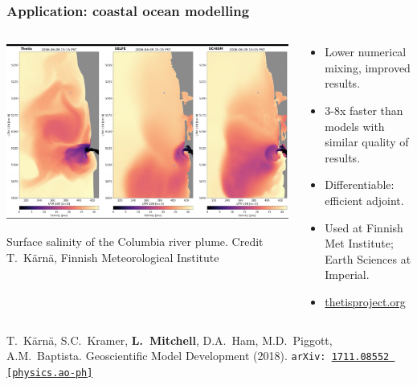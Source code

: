 \documentclass[presentation,aspectratio=43, 10pt]{beamer}
\newcommand{\arxivlink}[2]{{\texttt{arXiv:\,\href{https://arxiv.org/abs/#1}{#1\,[#2]}}}}
\begin{document}
\begin{frame}
  \frametitle{Application: coastal ocean modelling}
  \begin{columns}
    \begin{column}{0.55\textwidth}
      \includegraphics[height=0.45\textheight]{thetis-snapshot}

      {\tiny Surface salinity of the Columbia river plume. Credit
        T.~K\"arn\"a, Finnish Meteorological Institute}
    \end{column}
    \hspace{-0.04\textwidth}
    \begin{column}{0.48\textwidth}
      \begin{itemize}
      \item Lower numerical mixing, improved results.
      \item 3-8x faster than models with similar quality of results.
      \item Differentiable: efficient adjoint.
      \item Used at Finnish Met Institute; Earth Sciences at
        Imperial.
      \item \url{thetisproject.org}
       \end{itemize}
    \end{column}
  \end{columns}
  \begin{flushright}
    {\scriptsize T.~K\"arn\"a, S.C.~Kramer, \textbf{L.~Mitchell}, D.A.~Ham,
      M.D.~Piggott, A.M.~Baptista. Geoscientific Model Development
      (2018).
      \arxivlink{1711.08552}{physics.ao-ph}\nocite{Karna:2018}}
  \end{flushright}
\end{frame}
\end{document}
